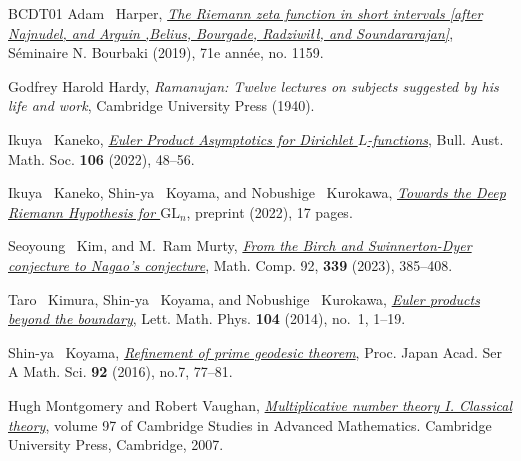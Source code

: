 \documentclass[12pt,reqno]{amsart}
\theoremstyle{definition}
\numberwithin{equation}{section}
\begin{document}
\begin{thebibliography}{BCDT01}
 Adam ~Harper, \href{https://www.bourbaki.fr/TEXTES/Exp1159-Harper.pdf}{\emph{The Riemann zeta function in short intervals [after Najnudel, and Arguin ,Belius, Bourgade,
Radziwiłł, and Soundararajan]}},  Séminaire N. Bourbaki (2019), 71e année, no. 1159.  

Godfrey Harold Hardy, \emph{Ramanujan: Twelve lectures on subjects suggested by his life and work}, Cambridge University Press (1940). 


Ikuya ~Kaneko, \href{https://www.cambridge.org/core/journals/bulletin-of-the-australian-mathematical-society/article/abs/euler-product-asymptotics-for-dirichlet-boldsymbol-l-functions/98D1411C4316977B18A10A81222E22A6}{\emph{Euler Product Asymptotics for Dirichlet $L$-functions}},  Bull. Aust. Math. Soc. \textbf{106} (2022), 48–56. 

Ikuya ~Kaneko, Shin-ya ~Koyama, and Nobushige ~Kurokawa, 
\emph{\href{https://arxiv.org/abs/2206.02612} {Towards the {D}eep {R}iemann {H}ypothesis for {$\mathrm{GL}_{n}$}}}, preprint (2022), 17 pages.




 Seoyoung ~Kim, and M.~Ram Murty, \href{https://www.ams.org/journals/mcom/2023-92-339/S0025-5718-2022-03773-X/S0025-5718-2022-03773-X.pdf}{\emph{From the Birch and Swinnerton-Dyer conjecture to Nagao's conjecture}}, Math. Comp. 92, \textbf{339} (2023), 385–408. 

Taro ~Kimura, Shin-ya ~Koyama, and Nobushige ~Kurokawa, \href{https://link.springer.com/article/10.1007/s11005-013-0644-3}{\emph{{E}uler products beyond the
  boundary}}, Lett. Math. Phys. \textbf{104} (2014), no.~1, 1--19.


Shin-ya ~Koyama, 
\href{https://projecteuclid.org/journals/proceedings-of-the-japan-academy-series-a-mathematical-sciences/volume-92/issue-7/Refinement-of-prime-geodesic-theorem/10.3792/pjaa.92.77.full}{\emph{Refinement of prime geodesic theorem}}, Proc. Japan Acad. Ser A Math. Sci. \textbf{92}  (2016), no.7, 77--81.

Hugh Montgomery and Robert Vaughan, \href{https://www.cambridge.org/core/books/multiplicative-number-theory-i/4E45519B26115AEEA4839C6C38206ACD}{\emph{Multiplicative number theory I. Classical theory}}, volume 97 of
Cambridge Studies in Advanced Mathematics. Cambridge University Press, Cambridge, 2007.


\end{thebibliography}
\end{document}

